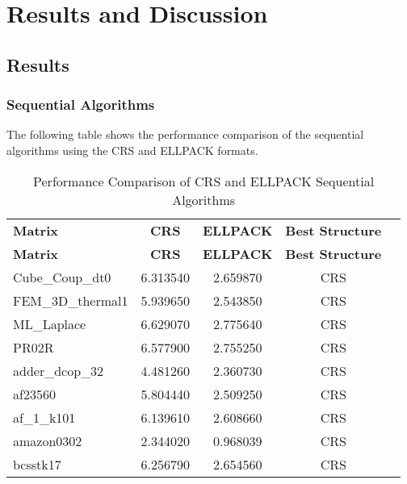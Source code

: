 \documentclass[12pt,oneside]{book} %
\begin{document}
\chapter{Results and Discussion}
\section{Results}

\subsection{Sequential Algorithms}

The following table shows the performance comparison of the sequential
algorithms using the CRS and ELLPACK formats.

\begin{longtable}{lcccr}
    \label{tab:sequential}                                                        \\
    \caption{Performance Comparison of CRS and ELLPACK Sequential Algorithms}     \\
    \toprule
    \textbf{Matrix}   & \textbf{CRS} & \textbf{ELLPACK} & \textbf{Best Structure} \\
    \midrule
    \endfirsthead
    \toprule
    \textbf{Matrix}   & \textbf{CRS} & \textbf{ELLPACK} & \textbf{Best Structure} \\
    \midrule
    \endhead
    \bottomrule
    \endfoot
    Cube\_Coup\_dt0   & 6.313540     & 2.659870         & CRS                     \\
    FEM\_3D\_thermal1 & 5.939650     & 2.543850         & CRS                     \\
    ML\_Laplace       & 6.629070     & 2.775640         & CRS                     \\
    PR02R             & 6.577900     & 2.755250         & CRS                     \\
    adder\_dcop\_32   & 4.481260     & 2.360730         & CRS                     \\
    af23560           & 5.804440     & 2.509250         & CRS                     \\
    af\_1\_k101       & 6.139610     & 2.608660         & CRS                     \\
    amazon0302        & 2.344020     & 0.968039         & CRS                     \\
    bcsstk17          & 6.256790     & 2.654560         & CRS                     \\

\end{longtable}
\end{document}
